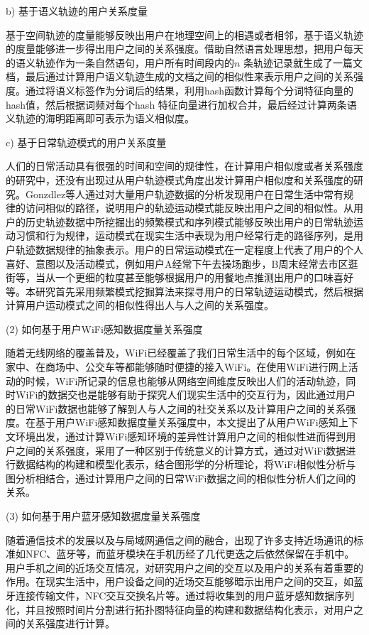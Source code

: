 \par b) 基于语义轨迹的用户关系度量
\par 基于空间轨迹的度量能够反映出用户在地理空间上的相遇或者相邻，基于语义轨迹的度量能够进一步得出用户之间的关系强度。借助自然语言处理思想，把用户每天的语义轨迹作为一条自然语句，用户所有时间段内的$n$ 条轨迹记录就生成了一篇文档，最后通过计算用户语义轨迹生成的文档之间的相似性来表示用户之间的关系强度。通过将语义标签作为分词后的结果，利用hash函数计算每个分词特征向量的hash值，然后根据词频对每个hash 特征向量进行加权合并，最后经过计算两条语义轨迹的海明距离即可表示为语义相似度。%
\par c) 基于日常轨迹模式的用户关系度量
\par 人们的日常活动具有很强的时间和空间的规律性，在计算用户相似度或者关系强度的研究中，还没有出现过从用户轨迹模式角度出发计算用户相似度和关系强度的研究。Gonzdlez等人通过对大量用户轨迹数据的分析发现用户在日常生活中常有规律的访问相似的路径，说明用户的轨迹运动模式能反映出用户之间的相似性。从用户的历史轨迹数据中所挖掘出的频繁模式和序列模式能够反映出用户的日常轨迹运动习惯和行为规律，运动模式在现实生活中表现为用户经常行走的路径序列，是用户轨迹数据规律的抽象表示。用户的日常运动模式在一定程度上代表了用户的个人喜好、意图以及活动模式，例如用户A经常下午去操场跑步，B周末经常去市区逛街等，当从一个更细的粒度甚至能够根据用户的用餐地点推测出用户的口味喜好等。本研究首先采用频繁模式挖掘算法来探寻用户的日常轨迹运动模式，然后根据计算用户运动模式之间的相似性得出人与人之间的关系强度。
\par (2) 如何基于用户WiFi感知数据度量关系强度
\par 随着无线网络的覆盖普及，WiFi已经覆盖了我们日常生活中的每个区域，例如在家中、在商场中、公交车等都能够随时便捷的接入WiFi。在使用WiFi进行网上活动的时候，WiFi所记录的信息也能够从网络空间维度反映出人们的活动轨迹，同时WiFi的数据交也是能够有助于探究人们现实生活中的交互行为，因此通过用户的日常WiFi数据也能够了解到人与人之间的社交关系以及计算用户之间的关系强度。在基于用户WiFi感知数据度量关系强度中，本文提出了从用户WiFi感知上下文环境出发，通过计算WiFi感知环境的差异性计算用户之间的相似性进而得到用户之间的关系强度，采用了一种区别于传统意义的计算方式，通过对WiFi数据进行数据结构的构建和模型化表示，结合图形学的分析理论，将WiFi相似性分析与图分析相结合，通过计算用户之间的日常WiFi数据之间的相似性分析人们之间的关系。
\par (3) 如何基于用户蓝牙感知数据度量关系强度
\par 随着通信技术的发展以及与局域网通信之间的融合，出现了许多支持近场通讯的标准如NFC、蓝牙等，而蓝牙模块在手机历经了几代更迭之后依然保留在手机中。用户手机之间的近场交互情况，对研究用户之间的交互以及用户的关系有着重要的作用。在现实生活中，用户设备之间的近场交互能够暗示出用户之间的交互，如蓝牙连接传输文件，NFC交互交换名片等。通过将收集到的用户蓝牙感知数据序列化，并且按照时间片分割进行拓扑图特征向量的构建和数据结构化表示，对用户之间的关系强度进行计算。
